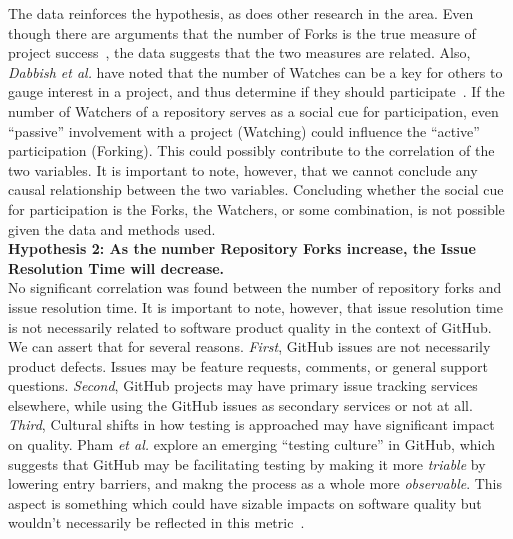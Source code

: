 \documentclass{proc}
\begin{document}
{{{{{{The data reinforces the hypothesis, as does other research in the area. Even though there are arguments that the number of Forks is the true measure of project success~\cite{baudry2012towards}, the data suggests that the two measures are related. Also, \textit{Dabbish et al.} have noted that the number of Watches can be a key for others to gauge interest in a project, and thus determine if they should participate~\cite{dabbish2013leveraging}. If the number of Watchers of a repository serves as a social cue for participation, even ``passive'' involvement with a project (Watching) could influence the ``active'' participation (Forking). This could possibly contribute to the correlation of the two variables. It is important to note, however, that we cannot conclude any causal relationship between the two variables. Concluding whether the social cue for participation is the Forks, the Watchers, or some combination, is not possible given the data and methods used.\\

\noindent \textbf{Hypothesis 2: As the number Repository Forks increase, the Issue Resolution Time will decrease.}\\
No significant correlation was found between the number of repository forks and issue resolution time. It is important to note, however, that issue resolution time is not necessarily related to software product quality in the context of GitHub. We can assert that for several reasons. \textit{First}, GitHub issues are not necessarily product defects. Issues may be feature requests, comments, or general support questions. \textit{Second}, GitHub projects may have primary issue tracking services elsewhere, while using the GitHub issues as secondary services or not at all. \textit{Third}, Cultural shifts in how testing is approached may have significant impact on quality. Pham \textit{et al.} explore an emerging ``testing culture'' in GitHub, which suggests that GitHub may be facilitating testing by making it more \emph{triable} by lowering entry barriers, and makng the process as a whole more \emph{observable}. This aspect is something which could have sizable impacts on software quality but wouldn't necessarily be reflected in this metric~\cite{phamcreating}.

}}}}}}
\end{document}
